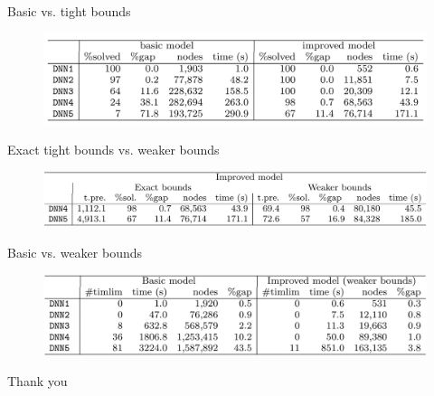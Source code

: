 \documentclass{beamer}
\begin{document}
\begin{frame}{Basic vs. tight bounds}
  \begin{figure}
    \centering
    \includegraphics[width=\columnwidth]{tab-1.png}
  \end{figure}
\end{frame}

\begin{frame}{Exact tight bounds vs. weaker bounds}
  \begin{figure}
    \centering
    \includegraphics[width=\columnwidth]{tab-2.png}
  \end{figure}
\end{frame}

\begin{frame}{Basic vs. weaker bounds}
  \begin{figure}
    \centering
    \includegraphics[width=\columnwidth]{tab-3.png}
  \end{figure}
\end{frame}

\begin{frame}
  \Huge{\centerline{Thank you}}
\end{frame}
\end{document}
